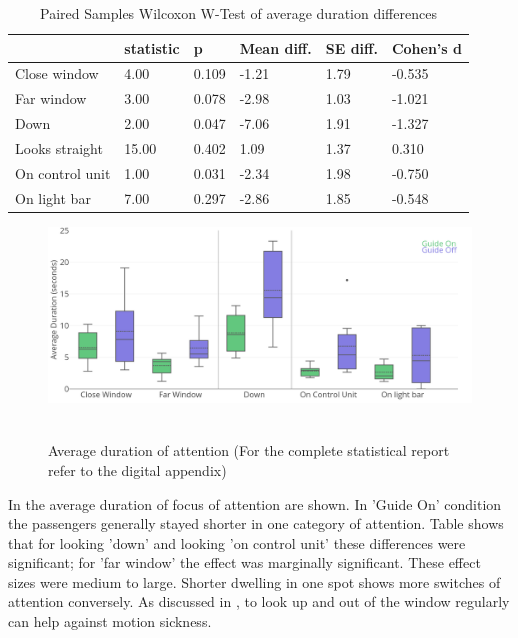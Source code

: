 \begin{table}[]
\label{tab:averageVideo}
  \caption{Paired Samples Wilcoxon W-Test of average duration differences}
\begin{tabular}{@{}llllll@{}}
\toprule
 & statistic & p & Mean diff. & SE diff. & Cohen's d \\ \midrule
Close window & 4.00 & 0.109 & -1.21 & 1.79 & -0.535 \\
Far window & 3.00 & 0.078 & -2.98 & 1.03 & -1.021 \\
Down & 2.00 & 0.047 & -7.06 & 1.91 & -1.327 \\
Looks straight & 15.00 & 0.402 & 1.09 & 1.37 & 0.310 \\
On control unit & 1.00 & 0.031 & -2.34 & 1.98 & -0.750 \\
On light bar & 7.00 & 0.297 & -2.86 & 1.85 & -0.548 \\ \bottomrule
\end{tabular}
\end{table}

\begin{figure}
    \includegraphics[width=1\textwidth]{fig/Average.png}\hfill\
    \caption[Average Duration of Attention]{Average duration of attention (For the complete statistical report refer to the digital appendix)}
    \label{fig:attentionAverage}
\end{figure}


In \emph{} the average duration of focus of attention are shown. In 'Guide On' condition the passengers generally stayed shorter in one category of attention. Table \emph{} shows that for looking 'down' and looking 'on control unit' these differences were significant; for 'far window' the effect was marginally significant. These effect sizes were medium to large. Shorter dwelling in one spot shows more switches of attention conversely. As discussed in \emph{}, to look up and out of the window regularly can help against motion sickness. 

